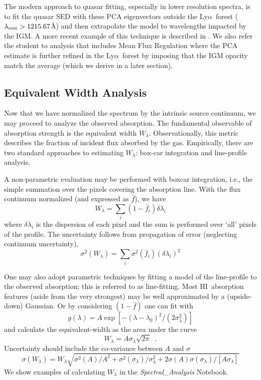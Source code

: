 \documentclass[graybox]{svmult}
\newcommand{\HI}{H{\sc I}}
\def\lya{Ly$\alpha$}
\def\smm{\sum\limits}
\begin{document}
The modern approach to quasar fitting, especially in 
lower resolution spectra, is to fit the quasar SED
with these PCA eigenvectors outside the \lya\ forest
($\lambda_{\rm rest} > 1215.67$\AA) and then extrapolate
the model to wavelengths impacted by the IGM.
A more recent example of this technique is described
in \cite{paris11}.  We also refer the student to analysis
that includes Mean Flux Regulation \cite{lee+12} where the
PCA estimate is further refined in the \lya\ forest by
imposing that the IGM opacity match the average (which
we derive in a later section).

\subsection{Equivalent Width Analysis}

Now that we have normalized the spectrum by the
intrinsic source continuum, we may proceed to analyze
the observed absorption.  The fundamental observable
of absorption strength is the equivalent width $W_\lambda$.
Observationally, this metric describes the fraction of
incident flux absorbed by the gas.  Empirically, there
are two standard approaches to estimating $W_\lambda$:
box-car integration and line-profile analysis.

A non-parametric evaluation may be performed with
boxcar integration, i.e.,
the simple summation over the pixels covering the absorption line.
With the flux continuum normalized  (and expressed as $\bar f$),
we have
\begin{equation}
W_\lambda = \smm_i (1- \bar f_i) \delta\lambda_i
\label{eqn:EWtwo}
\end{equation}
where $\delta\lambda_i$ is the dispersion of each pixel
and the sum is performed over `all' pixels of the profile.
The uncertainty follows from propagation of error (neglecting
continuum uncertainty),
\begin{equation}
\sigma^2(W_\lambda) = \smm_i \sigma^2(\bar f_i) (\delta\lambda_i)^2
\label{eqn:sigEW}
\end{equation}

One may also adopt parametric techniques by fitting a model
of the line-profile to the observed absorption;  this is
referred to as line-fitting.  Most \HI\ absorption features
(aside from the very strongest) may be
well approximated by a (upside-down) Gaussian.  Or by   
considering $(1-\bar f)$ one can fit with
\begin{equation}
g(\lambda) = A \exp[- (\lambda-\lambda_0)^2 / (2 \sigma_\lambda^2)]
\end{equation}
and calculate the equivalent-width as the 
area under the curve
\begin{equation}
W_\lambda = A \sigma_\lambda \sqrt{2 \pi} \;\; .
\end{equation}
Uncertainty should include the co-variance between $A$ and $\sigma$
\begin{equation}
\sigma(W_\lambda) = W_\lambda \sqrt{\sigma^2(A)/A^2 +
		\sigma^2(\sigma_\lambda)/\sigma_\lambda^2 + 2 \sigma(A)\sigma(\sigma_\lambda)/[A \sigma_\lambda]}
\end{equation}
We show examples of calculating $W_\lambda$ in the
{\it Spectral\_Analysis} Notebook.
\end{document}
